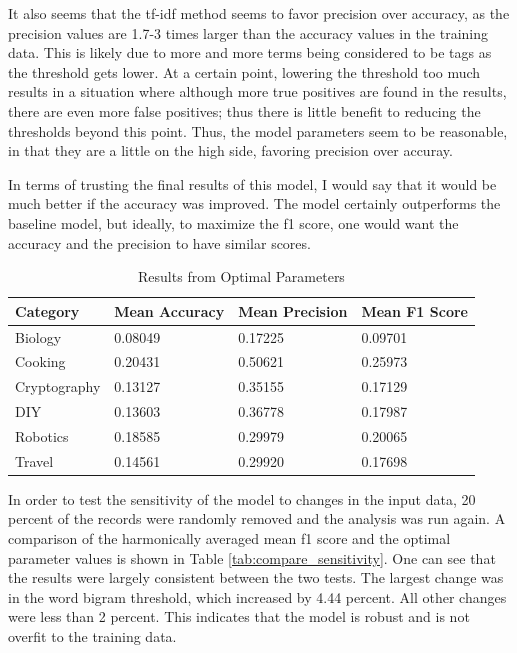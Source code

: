 \documentclass{article}
\begin{document}
It also seems that the tf-idf method seems to favor precision over accuracy,
as the precision values are 1.7-3 times larger than the accuracy values in the
training data. This is likely due to more and more terms being considered to
be tags as the threshold gets lower. At a certain point, lowering the
threshold too much results in a situation where although more true positives
are found in the results, there are even more false positives; thus there is
little benefit to reducing the thresholds beyond this point. Thus, the model
parameters seem to be reasonable, in that they are a little on the high side,
favoring precision over accuray.

In terms of trusting the final results of this model, I would say that it
would be much better if the accuracy was improved. The model certainly
outperforms the baseline model, but ideally, to maximize the f1 score, one
would want the accuracy and the precision to have similar scores.


\begin{table}[!]
\centering
\caption{Results from Optimal Parameters}
\label{tab:optimal_params_train}
\begin{tabular}{|l|l|l|l|}
\hline
Category & Mean Accuracy & Mean Precision & Mean F1 Score  \\ \hline
Biology & 0.08049 & 0.17225 & 0.09701 \\ \hline
Cooking & 0.20431 & 0.50621 & 0.25973 \\ \hline
Cryptography & 0.13127 & 0.35155 & 0.17129 \\ \hline
DIY & 0.13603 & 0.36778 & 0.17987 \\ \hline
Robotics & 0.18585 & 0.29979 & 0.20065 \\ \hline
Travel & 0.14561 & 0.29920 & 0.17698 \\ \hline
\end{tabular}
\end{table}

In order to test the sensitivity of the model to changes in the input data, 20
percent of the records were randomly removed and the analysis was run
again. A comparison of the harmonically averaged mean f1 score and the optimal
parameter values is shown in Table \ref{tab:compare_sensitivity}. One can see
that the results were largely consistent between the two tests. The largest
change was in the word bigram threshold, which increased by 4.44 percent. All
other changes were less than 2 percent. This indicates that the model is
robust and is not overfit to the training data.
\end{document}
